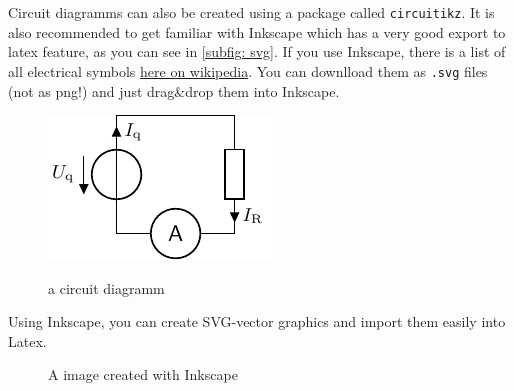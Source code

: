 \documentclass[	%
		fontsize=11pt,  %
		a4paper,	    %
		english,		%
		sans,			%
		f1,				%
	]{HsH-report}		%
\begin{document}
		\pagebreak
		Circuit diagramms can also be created using a package called \lstinline{circuitikz}. It is also recommended to get familiar with Inkscape which
		has a very good export to latex feature, as you can see in \autoref{subfig: svg}. If you use Inkscape, there is a list of all electrical
		symbols \href{https://de.wikipedia.org/wiki/Liste_der_Schaltzeichen_(Elektrik/Elektronik)}{here on wikipedia}. You can downlload them as
		\lstinline{.svg} files (not as png!) and just drag\&drop them into Inkscape.
		\begin{figure}
			\includegraphics{crc/exampleCircuit.pdf}
			\label{subfig: circuit}
			\caption{a circuit diagramm}
		\end{figure}

		\pagebreak
		Using Inkscape, you can create SVG-vector graphics and import them easily into Latex.
		\begin{figure}
			\def\svgwidth{0.3\textwidth} %
			\graphicspath{{svg/}} %
			\caption{A image created with Inkscape}
			\label{subfig: svg}
		\end{figure}
		\enlargethispage{4\baselineskip}
\end{document}
